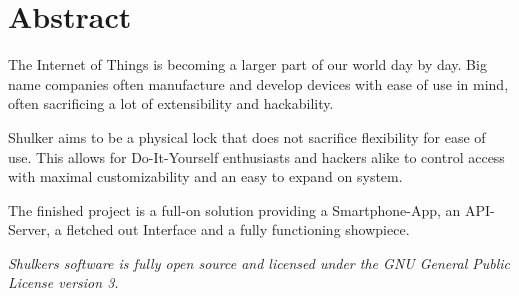 \section*{Abstract}

The Internet of Things is becoming a larger part of our world day by day. Big name companies often manufacture and develop devices with ease of use in mind, often sacrificing a lot of extensibility and hackability.

Shulker aims to be a physical lock that does not sacrifice flexibility for ease of use. This allows for Do-It-Yourself enthusiasts and hackers alike to control access with maximal customizability and an easy to expand on system.

The finished project is a full-on solution providing a Smartphone-App, an API-Server, a fletched out Interface and a fully functioning showpiece.

\textit{Shulkers software is fully open source and licensed under the GNU General Public License version 3.}

\newpage